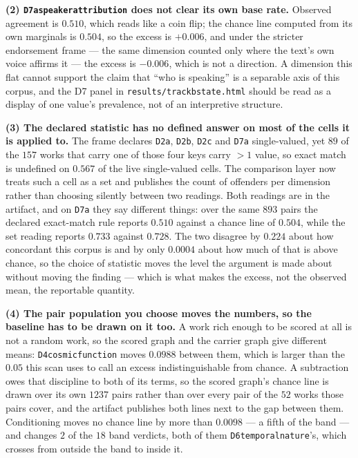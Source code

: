 \documentclass[11pt]{article}
\DeclareRobustCommand{\_}{\textunderscore\allowbreak}
\newcommand{\dimkey}[1]{\texttt{\small #1}}
\begin{document}
\textbf{(2) \dimkey{D7a\_speaker\_attribution} does not clear its own base rate.} Observed
agreement is \(0.510\), which reads like a coin flip; the chance line computed from its
own marginals is \(0.504\), so the excess is \(+0.006\), and under the stricter endorsement
frame --- the same dimension counted only where the text's own voice affirms it --- the
excess is \(-0.006\), which is not a direction. A dimension this flat cannot support the
claim that ``who is speaking'' is a separable axis of this corpus, and the D7 panel in
\texttt{results/track\_b\_state.html} should be read as a display of one value's
prevalence, not of an interpretive structure.

\textbf{(3) The declared statistic has no defined answer on most of the cells it is applied
to.} The frame declares \dimkey{D2a}, \dimkey{D2b}, \dimkey{D2c} and \dimkey{D7a}
single-valued, yet \(89\) of the \(157\) works that carry one of those four keys carry
\(>1\) value, so exact match is undefined on \(0.567\) of the live single-valued cells. The
comparison layer now treats such a cell as a set and publishes the count of offenders per
dimension rather than choosing silently between two readings. Both readings are in the
artifact, and on \dimkey{D7a} they say different things: over the same \(893\) pairs the
declared exact-match rule reports \(0.510\) against a chance line of \(0.504\), while the set
reading reports \(0.733\) against \(0.728\). The two disagree by \(0.224\) about how
concordant this corpus is and by only \(0.0004\) about how much of that is above chance, so
the choice of statistic moves the level the argument is made about without moving the
finding --- which is what makes the excess, not the observed mean, the reportable quantity.

\textbf{(4) The pair population you choose moves the numbers, so the baseline has to be
drawn on it too.} A work rich enough to be scored at all is not a random work, so the scored
graph and the carrier graph give different means: \dimkey{D4\_cosmic\_function} moves
\(0.0988\) between them, which is larger than the \(0.05\) this scan uses to call an excess
indistinguishable from chance. A subtraction owes that discipline to both of its terms, so
the scored graph's chance line is drawn over its own \(1237\) pairs rather than over every
pair of the \(52\) works those pairs cover, and the artifact publishes both lines next to
the gap between them. Conditioning moves no chance line by more than \(0.0098\) --- a fifth
of the band --- and changes \(2\) of the \(18\) band verdicts, both of them
\dimkey{D6\_temporal\_nature}'s, which crosses from outside the band to inside it.
\end{document}
